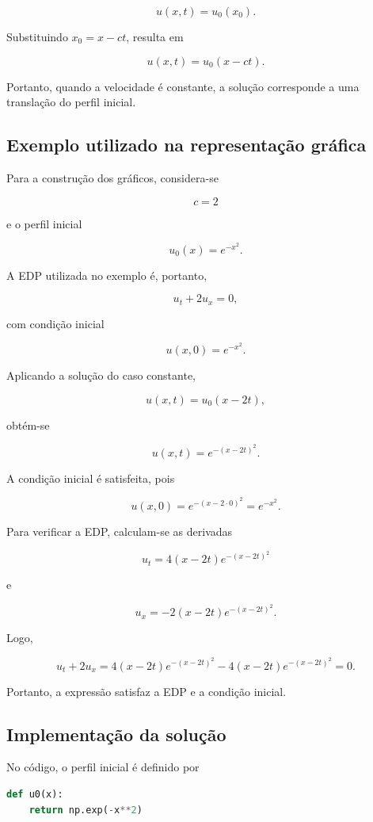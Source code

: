 \documentclass[
    12pt,
    oneside,
    a4paper,
    english,
    brazilian,
    chapter=TITLE,
    sumario=tradicional
]{abntex2}
\begin{document}
\[
    u(x,t)=u_0(x_0).
\]

Substituindo $x_0=x-ct$, resulta em

\[
    \boxed{
        u(x,t)=u_0(x-ct)
    }.
\]

Portanto, quando a velocidade é constante, a solução corresponde a uma
translação do perfil inicial.

\subsection{Exemplo utilizado na representação gráfica}

Para a construção dos gráficos, considera-se

\[
    c=2
\]

e o perfil inicial

\[
    u_0(x)=e^{-x^2}.
\]

A EDP utilizada no exemplo é, portanto,

\[
    u_t+2u_x=0,
\]

com condição inicial

\[
    u(x,0)=e^{-x^2}.
\]

Aplicando a solução do caso constante,

\[
    u(x,t)=u_0(x-2t),
\]

obtém-se

\[
    \boxed{
        u(x,t)=e^{-(x-2t)^2}
    }.
\]

A condição inicial é satisfeita, pois

\[
    u(x,0)
    =
    e^{-(x-2\cdot 0)^2}
    =
    e^{-x^2}.
\]

Para verificar a EDP, calculam-se as derivadas

\[
    u_t
    =
    4(x-2t)e^{-(x-2t)^2}
\]

e

\[
    u_x
    =
    -2(x-2t)e^{-(x-2t)^2}.
\]

Logo,

\[
    u_t+2u_x
    =
    4(x-2t)e^{-(x-2t)^2}
    -
    4(x-2t)e^{-(x-2t)^2}
    =
    0.
\]

Portanto, a expressão satisfaz a EDP e a condição inicial.

\subsection{Implementação da solução}

No código, o perfil inicial é definido por

\begin{lstlisting}[language=Python]
def u0(x):
    return np.exp(-x**2)
\end{lstlisting}
\end{document}
